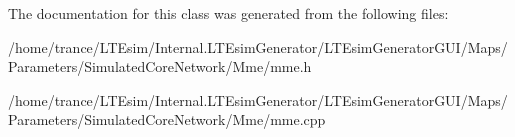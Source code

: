 The documentation for this class was generated from the following files\+:\begin{DoxyCompactItemize}
\item 
/home/trance/\+L\+T\+Esim/\+Internal.\+L\+T\+Esim\+Generator/\+L\+T\+Esim\+Generator\+G\+U\+I/\+Maps/\+Parameters/\+Simulated\+Core\+Network/\+Mme/mme.\+h\item 
/home/trance/\+L\+T\+Esim/\+Internal.\+L\+T\+Esim\+Generator/\+L\+T\+Esim\+Generator\+G\+U\+I/\+Maps/\+Parameters/\+Simulated\+Core\+Network/\+Mme/mme.\+cpp\end{DoxyCompactItemize}
